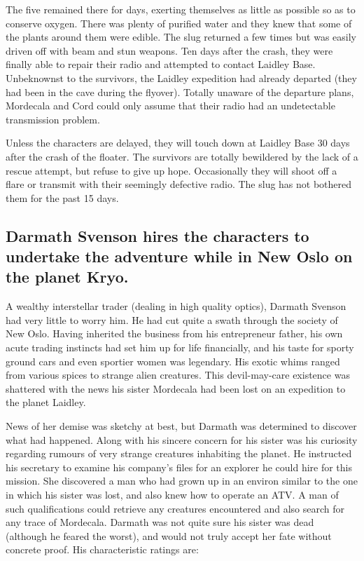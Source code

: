 The five remained there for days, exerting themselves as little as
possible so as to conserve oxygen. There was plenty of purified water
and they knew that some of the plants around them were edible. The
slug returned a few times but was easily driven off with beam and stun
weapons. Ten days after the crash, they were finally able to repair
their radio and attempted to contact Laidley Base.  Unbeknownst to the
survivors, the Laidley expedition had already departed (they had been
in the cave during the flyover). Totally unaware of the departure
plans, Mordecala and Cord could only assume that their radio had an
undetectable transmission problem.

Unless the characters are delayed, they will touch down at Laidley
Base 30 days after the crash of the floater. The survivors are totally
bewildered by the lack of a rescue attempt, but refuse to give up
hope. Occasionally they will shoot off a flare or transmit with their
seemingly defective radio. The slug has not bothered them for the past
15 days.



\subsection[Darmath Svenson]{Darmath Svenson hires the characters to
  undertake the 
  adventure while in New Oslo on the planet Kryo.}
\label{sec:darm-svens-hires}

A wealthy interstellar trader (dealing in high quality optics),
Darmath Svenson had very little to worry him. He had cut quite a swath
through the society of New Oslo. Having inherited the business from
his entrepreneur father, his own acute trading instincts had set him
up for life financially, and his taste for sporty ground cars and even
sportier women was legendary. His exotic whims ranged from various
spices to strange alien creatures. This devil-may-care existence was
shattered with the news his sister Mordecala had been lost on an
expedition to the planet Laidley.

News of her demise was sketchy at best, but Darmath was determined to
discover what had happened. Along with his sincere concern for his
sister was his curiosity regarding rumours of very strange creatures
inhabiting the planet. He instructed his secretary to examine his
company's files for an explorer he could hire for this mission. She
discovered a man who had grown up in an environ similar to the one in
which his sister was lost, and also knew how to operate an ATV. A man
of such qualifications could retrieve any creatures encountered and
also search for any trace of Mordecala. Darmath was not quite sure his
sister was dead (although he feared the worst), and would not truly
accept her fate without concrete proof. His characteristic ratings
are:

